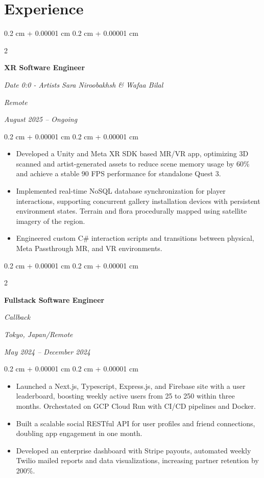 \documentclass[10pt, letterpaper]{article}
\newenvironment{highlights}{
    \begin{itemize}[
        topsep=0.1 cm,
        parsep=0.1 cm,
        partopsep=0pt,
        itemsep=0pt,
        leftmargin=0.2 cm + 10pt
    ]
}{
    \end{itemize}
} %
\newenvironment{onecolentry}{
    \begin{adjustwidth}{
        0.2 cm + 0.00001 cm
    }{
        0.2 cm + 0.00001 cm
    }
}{
    \end{adjustwidth}
} %
\newenvironment{twocolentry}[2][]{
    \onecolentry
    \def\secondColumn{#2}
    \setcolumnwidth{\fill, 5.0 cm}
    \begin{paracol}{2}
}{
    \switchcolumn \raggedleft \secondColumn
    \end{paracol}
    \endonecolentry
} %
\begin{document}
    \section{Experience}
 \begin{twocolentry}{
        \textit{Remote}

        \textit{August 2025 –  Ongoing}
    }
        \textbf{XR Software Engineer}

        \textit{Date 0:0 - Artists Sara Niroobakhsh \& Wafaa Bilal}
    \end{twocolentry}
    \vspace{0.10 cm}
    \begin{onecolentry}
        \begin{highlights}
          \item Developed a Unity and Meta XR SDK based MR/VR app, optimizing 3D scanned and artist-generated assets to reduce scene memory usage by 60\% and achieve a stable 90 FPS performance for standalone Quest 3.
\item Implemented real-time NoSQL database synchronization for player interactions, supporting concurrent gallery installation devices with persistent environment states. Terrain and flora procedurally mapped using satellite imagery of the region.
\item Engineered custom C\# interaction scripts and transitions between physical, Meta Passthrough MR, and VR environments.
        \end{highlights}
    \end{onecolentry}

    \vspace{0.2 cm}
    \begin{twocolentry}{
        \textit{Tokyo, Japan/Remote}

        \textit{May 2024 – December 2024}
    }
        \textbf{Fullstack Software Engineer}

        \textit{Callback}
    \end{twocolentry}
    \vspace{0.10 cm}
    \begin{onecolentry}
        \begin{highlights}
            \item Launched a Next.js, Typescript, Express.js, and Firebase site with a user leaderboard, boosting weekly active users from 25 to 250 within three months. Orchestated on GCP Cloud Run with CI/CD pipelines and Docker.
            \item Built a scalable social RESTful API for user profiles and friend connections, doubling app engagement in one month.
            \item Developed an enterprise dashboard with Stripe payouts, automated weekly Twilio mailed reports and data visualizations, increasing partner retention by 200\%.
        \end{highlights}
    \end{onecolentry}
\end{document}
